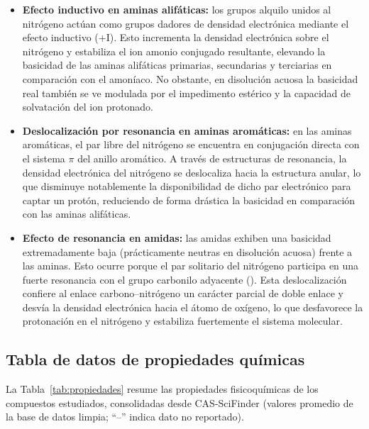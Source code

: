 \begin{itemize}
	\item \textbf{Efecto inductivo en aminas alifáticas:} los grupos alquilo unidos
	al nitrógeno actúan como grupos dadores de densidad electrónica mediante el
	efecto inductivo (+I). Esto incrementa la densidad electrónica sobre el
	nitrógeno y estabiliza el ion amonio conjugado resultante, elevando la
	basicidad de las aminas alifáticas primarias, secundarias y terciarias en
	comparación con el amoníaco. No obstante, en disolución acuosa la basicidad
	real también se ve modulada por el impedimento estérico y la capacidad de
	solvatación del ion protonado.
	\item \textbf{Deslocalización por resonancia en aminas aromáticas:} en las
	aminas aromáticas, el par libre del nitrógeno se encuentra en conjugación
	directa con el sistema $\pi$ del anillo aromático. A través de estructuras de
	resonancia, la densidad electrónica del nitrógeno se deslocaliza hacia la
	estructura anular, lo que disminuye notablemente la disponibilidad de dicho par
	electrónico para captar un protón, reduciendo de forma drástica la basicidad en
	comparación con las aminas alifáticas.
	\item \textbf{Efecto de resonancia en amidas:} las amidas exhiben una basicidad
	extremadamente baja (prácticamente neutras en disolución acuosa) frente a las
	aminas. Esto ocurre porque el par solitario del nitrógeno participa en una
	fuerte resonancia con el grupo carbonilo adyacente (). Esta
	deslocalización confiere al enlace carbono--nitrógeno un carácter parcial de
	doble enlace y desvía la densidad electrónica hacia el átomo de oxígeno, lo que
	desfavorece la protonación en el nitrógeno y estabiliza fuertemente el sistema
	molecular.
\end{itemize}

\subsection{Tabla de datos de propiedades químicas}
\label{sec:tabla}
La Tabla~\ref{tab:propiedades} resume las propiedades fisicoquímicas de los
compuestos estudiados, consolidadas desde CAS-SciFinder (valores promedio de la
base de datos limpia; ``--'' indica dato no reportado).

